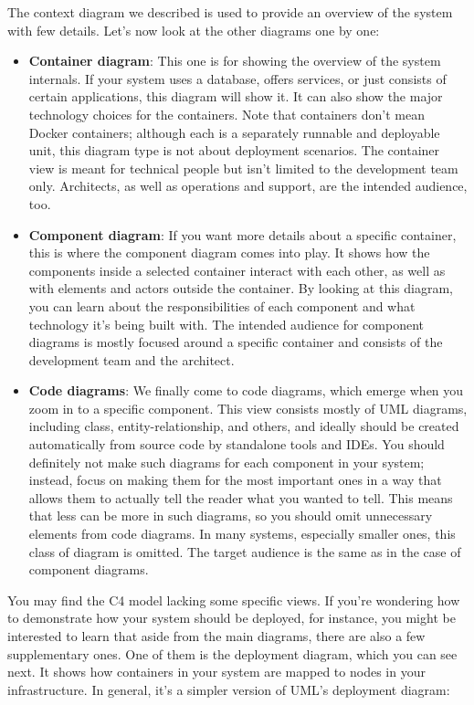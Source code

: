 The context diagram we described is used to provide an overview of the system with few details. Let's now look at the other diagrams one by one:

\begin{itemize}
\item
\textbf{Container diagram}: This one is for showing the overview of the system internals. If your system uses a database, offers services, or just consists of certain applications, this diagram will show it. It can also show the major technology choices for the containers. Note that containers don't mean Docker containers; although each is a separately runnable and deployable unit, this diagram type is not about deployment scenarios. The container view is meant for technical people but isn't limited to the development team only. Architects, as well as operations and support, are the intended audience, too.

\item 
\textbf{Component diagram}: If you want more details about a specific container, this is where the component diagram comes into play. It shows how the components inside a selected container interact with each other, as well as with elements and actors outside the container. By looking at this diagram, you can learn about the responsibilities of each component and what technology it's being built with. The intended audience for component diagrams is mostly focused around a specific container and consists of the development team and the architect.

\item
\textbf{Code diagrams}: We finally come to code diagrams, which emerge when you zoom in to a specific component. This view consists mostly of UML diagrams, including class, entity-relationship, and others, and ideally should be created automatically from source code by standalone tools and IDEs. You should definitely not make such diagrams for each component in your system; instead, focus on making them for the most important ones in a way that allows them to actually tell the reader what you wanted to tell. This means that less can be more in such diagrams, so you should omit unnecessary elements from code diagrams. In many systems, especially smaller ones, this class of diagram is omitted. The target audience is the same as in the case of component diagrams.
\end{itemize}

You may find the C4 model lacking some specific views. If you're wondering how to demonstrate how your system should be deployed, for instance, you might be interested to learn that aside from the main diagrams, there are also a few supplementary ones. One of them is the deployment diagram, which you can see next. It shows how containers in your system are mapped to nodes in your infrastructure. In general, it's a simpler version of UML's deployment diagram:

